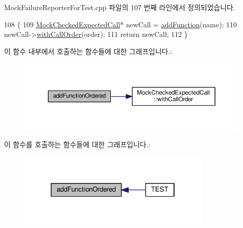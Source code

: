 Mock\+Failure\+Reporter\+For\+Test.\+cpp 파일의 107 번째 라인에서 정의되었습니다.


\begin{DoxyCode}
108 \{
109   \hyperlink{class_mock_checked_expected_call}{MockCheckedExpectedCall}* newCall = \hyperlink{class_mock_expected_calls_list_for_test_a7e10e8373d87ec69119e517e8e84cc9f}{addFunction}(name);
110   newCall->\hyperlink{class_mock_checked_expected_call_a4406dd9a38b0a29197dcde6a4c5c2289}{withCallOrder}(order);
111   \textcolor{keywordflow}{return} newCall;
112 \}
\end{DoxyCode}


이 함수 내부에서 호출하는 함수들에 대한 그래프입니다.\+:
\nopagebreak
\begin{figure}[H]
\begin{center}
\leavevmode
\includegraphics[width=350pt]{class_mock_expected_calls_list_for_test_af356afb9633ad30e4d49f26df7dfd454_cgraph}
\end{center}
\end{figure}




이 함수를 호출하는 함수들에 대한 그래프입니다.\+:
\nopagebreak
\begin{figure}[H]
\begin{center}
\leavevmode
\includegraphics[width=262pt]{class_mock_expected_calls_list_for_test_af356afb9633ad30e4d49f26df7dfd454_icgraph}
\end{center}
\end{figure}


